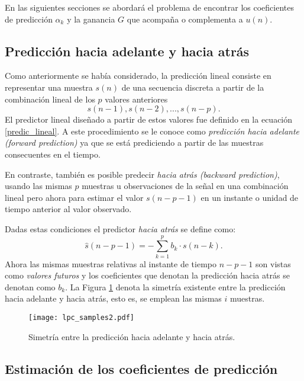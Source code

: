 En las siguientes secciones se abordará el problema de encontrar los coeficientes de predicción $\alpha_k$ y la ganancia $G$ que acompaña o complementa a $u(n)$.

\subsection{Predicción hacia adelante y hacia atrás}
Como anteriormente se había considerado, la predicción lineal consiste en representar una muestra $s(n)$ de una secuencia discreta a partir de la combinación lineal de los $p$ valores anteriores $$s(n-1),s(n-2),...,s(n-p).$$
El predictor lineal diseñado a partir de estos valores fue definido en la ecuación \eqref{predic_lineal}. A este procedimiento se le conoce como \emph{predicción hacia adelante (forward prediction)} ya que se está prediciendo a partir de las muestras consecuentes en el tiempo.

En contraste, también es posible predecir \emph{hacia atrás (backward prediction)}, usando las mismas $p$ muestras u observaciones de la señal en una combinación lineal pero ahora para estimar el valor $s(n-p-1)$ en un instante o unidad de tiempo anterior al valor observado. 

Dadas estas condiciones el predictor \emph{hacia atrás} se define como:
\begin{equation}\label{forw_predic}
\hat{s}(n-p-1)= -\sum_{k=1}^p b_{k} \cdot s(n-k).
\end{equation}
Ahora las mismas muestras relativas al instante de tiempo $n-p-1$ son vistas como \emph{valores futuros} y los coeficientes que denotan la predicción hacia atrás se denotan como $b_k$. La Figura \ref{lpc_samples2} denota la simetría existente entre la predicción hacia adelante y hacia atrás, esto es, se emplean las mismas $i$ muestras.

\begin{figure}[ht]
  \centering
  \texttt{[image: lpc\_samples2.pdf]}
  \caption{Simetría entre la predicción hacia adelante y hacia atrás.}
  \label{lpc_samples2}
\end{figure}

\subsection{Estimación de los coeficientes de predicción}

